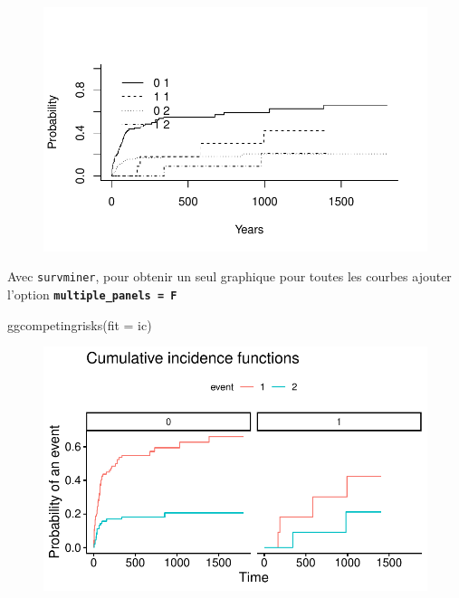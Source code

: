 \documentclass[
  12pt,
  letterpaper,
  DIV=11,
  numbers=noendperiod,
  onepage,
  openany]{scrreprt}
\newenvironment{Shaded}{\begin{snugshade}}{\end{snugshade}}
\newcommand{\AttributeTok}[1]{\textcolor[rgb]{0.80,0.80,0.80}{#1}}
\newcommand{\FunctionTok}[1]{\textcolor[rgb]{0.94,0.94,0.56}{#1}}
\newcommand{\NormalTok}[1]{\textcolor[rgb]{0.80,0.80,0.80}{#1}}
\begin{document}
\begin{figure}[H]

{\centering \includegraphics{14-R_files/figure-pdf/unnamed-chunk-44-1.pdf}

}

\end{figure}

Avec \texttt{survminer}, pour obtenir un seul graphique pour toutes les
courbes ajouter l'option \textbf{\texttt{multiple\_panels\ =\ F}}

\begin{Shaded}
\begin{Highlighting}[]
\FunctionTok{ggcompetingrisks}\NormalTok{(}\AttributeTok{fit =}\NormalTok{ ic)}
\end{Highlighting}
\end{Shaded}

\begin{figure}[H]

{\centering \includegraphics{14-R_files/figure-pdf/unnamed-chunk-45-1.pdf}

}

\end{figure}
\end{document}

